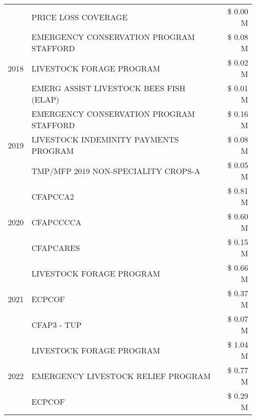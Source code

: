 \begin{tabular}{llr}
 & PRICE LOSS COVERAGE & \$ 0.00 M \\
\cline{1-3}
\multirow[t]{3}{*}{2018} & EMERGENCY CONSERVATION PROGRAM STAFFORD & \$ 0.08 M \\
 & LIVESTOCK FORAGE PROGRAM & \$ 0.02 M \\
 & EMERG ASSIST LIVESTOCK BEES FISH (ELAP) & \$ 0.01 M \\
\cline{1-3}
\multirow[t]{3}{*}{2019} & EMERGENCY CONSERVATION PROGRAM STAFFORD & \$ 0.16 M \\
 & LIVESTOCK INDEMINITY PAYMENTS PROGRAM & \$ 0.08 M \\
 & TMP/MFP 2019 NON-SPECIALITY CROPS-A & \$ 0.05 M \\
\cline{1-3}
\multirow[t]{3}{*}{2020} & CFAPCCA2 & \$ 0.81 M \\
 & CFAPCCCCA & \$ 0.60 M \\
 & CFAPCARES & \$ 0.15 M \\
\cline{1-3}
\multirow[t]{3}{*}{2021} & LIVESTOCK FORAGE PROGRAM & \$ 0.66 M \\
 & ECPCOF & \$ 0.37 M \\
 & CFAP3 - TUP & \$ 0.07 M \\
\cline{1-3}
\multirow[t]{3}{*}{2022} & LIVESTOCK FORAGE PROGRAM & \$ 1.04 M \\
 & EMERGENCY LIVESTOCK RELIEF PROGRAM & \$ 0.77 M \\
 & ECPCOF & \$ 0.29 M \\
\cline{1-3}
\bottomrule
\end{tabular}
